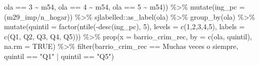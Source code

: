 \documentclass[
  12pt,
]{book}
\newenvironment{Shaded}{\begin{snugshade}}{\end{snugshade}}
\newcommand{\AttributeTok}[1]{\textcolor[rgb]{0.77,0.63,0.00}{#1}}
\newcommand{\ConstantTok}[1]{\textcolor[rgb]{0.00,0.00,0.00}{#1}}
\newcommand{\DecValTok}[1]{\textcolor[rgb]{0.00,0.00,0.81}{#1}}
\newcommand{\FunctionTok}[1]{\textcolor[rgb]{0.00,0.00,0.00}{#1}}
\newcommand{\NormalTok}[1]{#1}
\newcommand{\SpecialCharTok}[1]{\textcolor[rgb]{0.00,0.00,0.00}{#1}}
\newcommand{\StringTok}[1]{\textcolor[rgb]{0.31,0.60,0.02}{#1}}
\begin{document}
\begin{Shaded}
\begin{Highlighting}[]
\NormalTok{                             ola }\SpecialCharTok{==} \DecValTok{3} \SpecialCharTok{\textasciitilde{}}\NormalTok{ m54, ola }\SpecialCharTok{==} \DecValTok{4} \SpecialCharTok{\textasciitilde{}}\NormalTok{ m54, ola }\SpecialCharTok{==} \DecValTok{5} \SpecialCharTok{\textasciitilde{}}\NormalTok{ m54)) }\SpecialCharTok{\%\textgreater{}\%}
  \FunctionTok{mutate}\NormalTok{(}\AttributeTok{ing\_pc =}\NormalTok{ (m29\_imp}\SpecialCharTok{/}\NormalTok{n\_hogar)) }\SpecialCharTok{\%\textgreater{}\%}
\NormalTok{  sjlabelled}\SpecialCharTok{::}\FunctionTok{as\_label}\NormalTok{(ola) }\SpecialCharTok{\%\textgreater{}\%} 
  \FunctionTok{group\_by}\NormalTok{(ola) }\SpecialCharTok{\%\textgreater{}\%} 
  \FunctionTok{mutate}\NormalTok{(}\AttributeTok{quintil =} \FunctionTok{factor}\NormalTok{(}\FunctionTok{ntile}\NormalTok{(}\SpecialCharTok{{-}}\FunctionTok{desc}\NormalTok{(ing\_pc), }\DecValTok{5}\NormalTok{), }\AttributeTok{levels =} \FunctionTok{c}\NormalTok{(}\DecValTok{1}\NormalTok{,}\DecValTok{2}\NormalTok{,}\DecValTok{3}\NormalTok{,}\DecValTok{4}\NormalTok{,}\DecValTok{5}\NormalTok{),}
         \AttributeTok{labels =} \FunctionTok{c}\NormalTok{(}\StringTok{\textquotesingle{}Q1\textquotesingle{}}\NormalTok{, }\StringTok{\textquotesingle{}Q2\textquotesingle{}}\NormalTok{, }\StringTok{\textquotesingle{}Q3\textquotesingle{}}\NormalTok{, }\StringTok{\textquotesingle{}Q4\textquotesingle{}}\NormalTok{, }\StringTok{\textquotesingle{}Q5\textquotesingle{}}\NormalTok{))) }\SpecialCharTok{\%\textgreater{}\%} 
  \FunctionTok{prop}\NormalTok{(}\AttributeTok{x =}\NormalTok{ barrio\_crim\_rec, }\AttributeTok{by =} \FunctionTok{c}\NormalTok{(ola, quintil), }\AttributeTok{na.rm =} \ConstantTok{TRUE}\NormalTok{) }\SpecialCharTok{\%\textgreater{}\%} 
  \FunctionTok{filter}\NormalTok{(barrio\_crim\_rec }\SpecialCharTok{==} \StringTok{\textquotesingle{}Muchas veces o siempre\textquotesingle{}}\NormalTok{, quintil }\SpecialCharTok{==} \StringTok{"Q1"} \SpecialCharTok{|}\NormalTok{ quintil }\SpecialCharTok{==} \StringTok{"Q5"}\NormalTok{) }


\end{Highlighting}
\end{Shaded}
\end{document}
